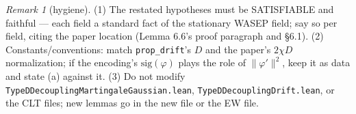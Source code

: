 \documentclass[11pt]{article}
\theoremstyle{plain}
\theoremstyle{remark}
\newtheorem{remark}{Remark}
\begin{document}
\begin{remark}[hygiene]
(1) The restated hypotheses must be SATISFIABLE and faithful --- each field a
standard fact of the stationary WASEP field; say so per field, citing the
paper location (Lemma 6.6's proof paragraph and \S6.1).
(2) Constants/conventions: match \texttt{prop\_drift}'s $D$ and the paper's
$2\chi D$ normalization; if the encoding's $\mathrm{sig}(\varphi)$ plays the
role of $\|\varphi'\|^2$, keep it as data and state (a) against it.
(3) Do not modify \texttt{TypeDDecouplingMartingaleGaussian.lean},
\texttt{TypeDDecouplingDrift.lean}, or the CLT files; new lemmas go in the new
file or the EW file.
\end{remark}
\end{document}
